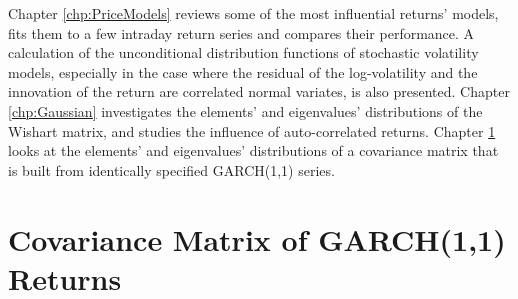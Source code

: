\documentclass{report}
\begin{document}
Chapter \ref{chp:PriceModels} reviews some of the most
influential returns' models, fits them to a few intraday return
series and compares their performance. A calculation of the
unconditional distribution functions of stochastic volatility models,
especially in the case where the residual of the log-volatility
and the innovation of the return are correlated normal variates, is
also presented. Chapter \ref{chp:Gaussian} investigates the elements' and
eigenvalues' distributions of the Wishart matrix, and studies the influence
of auto-correlated returns. Chapter \ref{chp:CrossCorrelationFat}
looks at the elements' and eigenvalues' distributions of a covariance
matrix that is built from identically specified GARCH(1,1) series.






\chapter{Covariance Matrix of GARCH(1,1) Returns}
\label{chp:CrossCorrelationFat}

\end{document}
